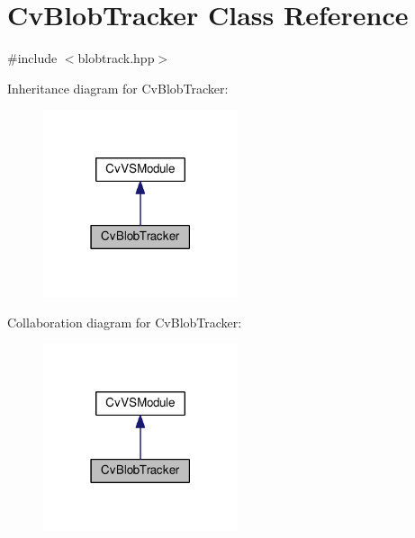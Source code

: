 \hypertarget{classCvBlobTracker}{\section{Cv\-Blob\-Tracker Class Reference}
\label{classCvBlobTracker}
}


{\ttfamily \#include $<$blobtrack.\-hpp$>$}



Inheritance diagram for Cv\-Blob\-Tracker\-:\nopagebreak
\begin{figure}[H]
\begin{center}
\leavevmode
\includegraphics[width=162pt]{classCvBlobTracker__inherit__graph}
\end{center}
\end{figure}


Collaboration diagram for Cv\-Blob\-Tracker\-:\nopagebreak
\begin{figure}[H]
\begin{center}
\leavevmode
\includegraphics[width=162pt]{classCvBlobTracker__coll__graph}
\end{center}
\end{figure}
